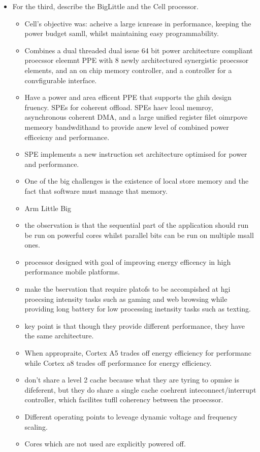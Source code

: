 \begin{itemize}
\begin{itemize}
\end{itemize}
\item For the third, describe the BigLittle and the Cell processor. 
\begin{itemize}
\item Cell's objective was: acheive a large icnrease in performance, keeping the power
budget samll, whilst maintaining easy programmability. 
\item Combines a dual threaded dual issue 64 bit power architecture compliant
proecssor eleemnt PPE with 8 newly architectured synergistic proecssor elements, and an on chip
memory controller, and a controller for a convfigurable interface. 
\item Have a power and area efficent PPE that supports the ghih design fruency. SPEs for coherent offload. SPEs haev lcoal memroy,
asynchronous coherent DMA, and a large unified register filet oimrpove memeory bandwdithand to provide anew level of combined power
efficeicny and performance. 
\item SPE implements a new instruction set architecture optimised for 
power and performance. 
\item One of the big challenges is the existence of local store memory
and the fact that software must manage that memory. 
\end{itemize}
\begin{itemize}
\item Arm Little Big
\item the observation is that the sequential part of the application should 
run be run on powerful cores whilst parallel bits can be run on multiple msall ones. 
\item processor designed with goal of improving energy efficency in high
performance mobile platforms. 
\item make the bservation that require  platofs to be accompished at hgi proecsing
intensity tasks such as gaming and web browsing while providing long battery 
for low processing inetnsity tasks such as texting. 
\item key point is that though they provide different performance, they 
have the same architecture. 
\item When appropraite, Cortex A5 trades off energy efficiency for performanc
while
Cortex a8 trades off performance for energy efficiency. 
\item don't share a level 2 cache because what they are tyring to opmise is difeferent,
but they do share a single cache coehrent inteconnect/interrupt controller, which facilites tufll 
coherency between the proecssor. 
\item Different operating points to leveage dynamic voltage and frequency scaling. 
\item Cores which are not used are explicitly powered off.


\end{itemize}
\end{itemize}
